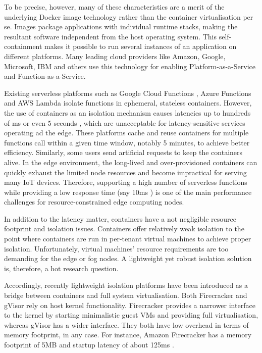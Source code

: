 To be precise, however, many of these characteristics are a merit of the underlying Docker image technology \cite{docker-image} rather than the container virtualisation per se. Images package applications with individual runtime stacks, making the resultant software independent from the host operating system. This self-containment makes it possible to run several instances of an application on different platforms. Many leading cloud providers like Amazon, Google, Microsoft, IBM and others use this technology for enabling Platform-as-a-Service and Function-as-a-Service.

Existing serverless \cite{jonas2019cloud} platforms such as Google Cloud Functions \cite{gcloud-functions}, Azure Functions \cite{azure-functions} and AWS Lambda \cite{aws-lambda} isolate functions in ephemeral, stateless containers. However, the use of containers as an isolation mechanism causes latencies up to hundreds of ms or even 5 seconds \cite{mohanty2018evaluation}, which are unacceptable for latency-sensitive services operating ad the edge. These platforms cache and reuse containers for multiple functions call within a given time window, notably 5 minutes, to achieve better efficiency. Similarly, some users send artificial requests to keep the containers alive. In the edge environment, the long-lived and over-provisioned containers can quickly exhaust the limited node resources and become impractical for serving many IoT devices. Therefore, supporting a high number of serverless functions while providing a low response time (say 10ms \cite{elbamby2019wireless}) is one of the main performance challenges for resource-constrained edge computing nodes.

In addition to the latency matter, containers have a not negligible resource footprint and isolation issues. Containers offer relatively weak isolation to the point where containers are run in per-tenant virtual machines to achieve proper isolation. Unfortunately, virtual machines' resource requirements are too demanding for the edge or fog nodes. A light\-weight yet robust isolation solution is, therefore, a hot research question.

Accordingly, recently lightweight isolation platforms have been introduced as a bridge between containers and full system virtualisation. Both Firecracker and gVisor \cite{caraza2020blending} rely on host kernel functionality. Firecracker provides a narrower interface to the kernel by starting minimalistic guest VMs and providing full virtualisation, whereas gVisor has a wider interface. They both have low overhead in terms of memory footprint, in any case. For instance, Amazon Firecracker has a memory footprint of 5MB and startup latency of about 125ms \cite{firecracker}.

